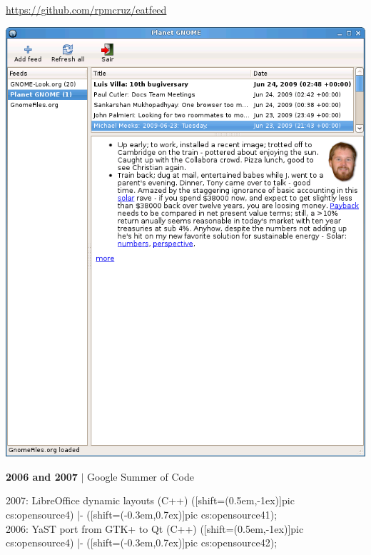 \documentclass[11pt]{article}
\begin{document}
\begin{multicols}{2}
\begin{samepage}
\\\\{\footnotesize \url{https://github.com/rpmcruz/eatfeed}}\\{\footnotesize\begin{minipage}{0.35\linewidth}\includegraphics[width=\linewidth]{imgs/cv-eatfeed.png}\end{minipage}}\par\end{samepage}\begin{samepage}\textbf{2006 and 2007} $\vert$ Google Summer of Code
\begin{adjustwidth}{1.5em}{}%
\footnotesize
{}2007: LibreOffice dynamic layouts (C++)
  ([shift={(0.5em,-1ex)}]pic cs:opensource4) |- ([shift={(-0.3em,0.7ex)}]pic cs:opensource41);\\2006: YaST port from GTK+ to Qt (C++)
  ([shift={(0.5em,-1ex)}]pic cs:opensource4) |- ([shift={(-0.3em,0.7ex)}]pic cs:opensource42);\\

\end{adjustwidth}
\end{samepage}
\end{multicols}
\end{document}
